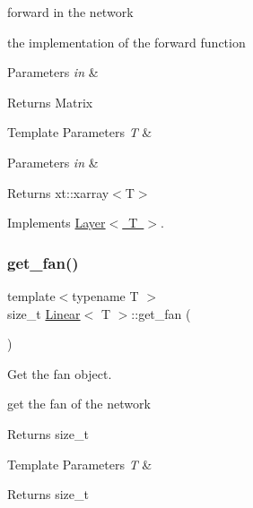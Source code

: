 forward in the network 

the implementation of the forward function


\begin{DoxyParams}{Parameters}
{\em in} & \\
\hline
\end{DoxyParams}
\begin{DoxyReturn}{Returns}
Matrix
\end{DoxyReturn}

\begin{DoxyTemplParams}{Template Parameters}
{\em T} & \\
\hline
\end{DoxyTemplParams}

\begin{DoxyParams}{Parameters}
{\em in} & \\
\hline
\end{DoxyParams}
\begin{DoxyReturn}{Returns}
xt\+::xarray$<$\+T$>$ 
\end{DoxyReturn}


Implements \mbox{\hyperlink{class_layer_ab15b665c86974b1cf1d7ba4e309cb0e5}{Layer$<$ T $>$}}.

\mbox{\label{class_linear_a753a7cb02a0b18e8922d23db905eb534}} 
\subsubsection{\texorpdfstring{get\_fan()}{get\_fan()}}
{\footnotesize\ttfamily template$<$typename T $>$ \\
size\+\_\+t \mbox{\hyperlink{class_linear}{Linear}}$<$ T $>$\+::get\+\_\+fan (\begin{DoxyParamCaption}{ }\end{DoxyParamCaption})\hspace{0.3cm}{\ttfamily [virtual]}}



Get the fan object. 

get the fan of the network

\begin{DoxyReturn}{Returns}
size\+\_\+t
\end{DoxyReturn}

\begin{DoxyTemplParams}{Template Parameters}
{\em T} & \\
\hline
\end{DoxyTemplParams}
\begin{DoxyReturn}{Returns}
size\+\_\+t 
\end{DoxyReturn}


